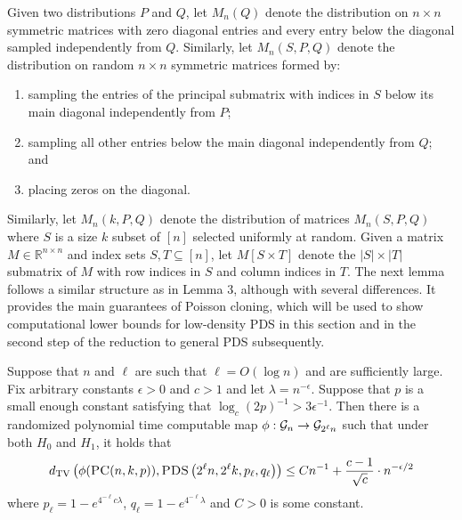 \documentclass[11pt]{article}
\begin{document}
Given two distributions $P$ and $Q$, let $M_n(Q)$ denote the distribution on $n \times n$ symmetric matrices with zero diagonal entries and every entry below the diagonal sampled independently from $Q$. Similarly, let $M_n(S, P, Q)$ denote the distribution on random $n \times n$ symmetric matrices formed by:
\begin{enumerate}
\item sampling the entries of the principal submatrix with indices in $S$ below its main diagonal independently from $P$;
\item sampling all other entries below the main diagonal independently from $Q$; and
\item placing zeros on the diagonal.
\end{enumerate}
Similarly, let $M_n(k, P, Q)$ denote the distribution of matrices $M_n(S, P, Q)$ where $S$ is a size $k$ subset of $[n]$ selected uniformly at random. Given a matrix $M \in \mathbb{R}^{n \times n}$ and index sets $S, T \subseteq [n]$, let $M[S \times T]$ denote the $|S| \times |T|$ submatrix of $M$ with row indices in $S$ and column indices in $T$. The next lemma follows a similar structure as in Lemma 3, although with several differences. It provides the main guarantees of Poisson cloning, which will be used to show computational lower bounds for low-density PDS in this section and in the second step of the reduction to general PDS subsequently. 

\begin{lemma}
Suppose that $n$ and $\ell$ are such that $\ell = O(\log n)$ and are sufficiently large. Fix arbitrary constants $\epsilon > 0$ and $c > 1$ and let $\lambda = n^{-\epsilon}$. Suppose that $p$ is a small enough constant satisfying that $\log_c (2p)^{-1} > 3\epsilon^{-1}$. Then there is a randomized polynomial time computable map $\phi : \mathcal{G}_n \to \mathcal{G}_{2^\ell n}$ such that under both $H_0$ and $H_1$, it holds that
$$d_{\text{TV}}\left( \phi(\textsc{PC}(n, k, p)), \textsc{PDS}\left(2^\ell n, 2^\ell k, p_\ell, q_\ell \right) \right) \le Cn^{-1} + \frac{c - 1}{\sqrt{c}} \cdot n^{-\epsilon/2}$$
where $p_\ell = 1 - e^{4^{-\ell} c\lambda}$, $q_\ell = 1 - e^{4^{-\ell} \lambda}$ and $C > 0$ is some constant.
\end{lemma}
\end{document}
